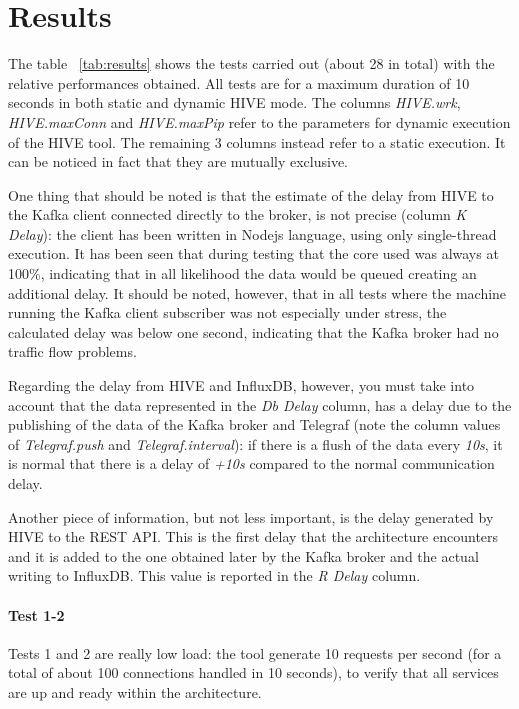 \documentclass[]{IEEEtran}
\begin{document}
\section{Results}
The table ~\ref{tab:results} shows the tests carried out (about 28 in total) with the relative performances obtained.
All tests are for a maximum duration of 10 seconds in both static and dynamic HIVE mode. The columns \textit{HIVE.wrk}, \textit{HIVE.maxConn} and \textit{HIVE.maxPip} refer to the parameters for dynamic execution of the HIVE tool. The remaining 3 columns instead refer to a static execution. It can be noticed in fact that they are mutually exclusive.

One thing that should be noted is that the estimate of the delay from HIVE to the Kafka client connected directly to the broker, is not precise (column \textit{K Delay}): the client has been written in Nodejs language, using only single-thread execution. It has been seen that during testing that the core used was always at 100\%, indicating that in all likelihood the data would be queued creating an additional delay. 
It should be noted, however, that in all tests where the machine running the Kafka client subscriber was not especially under stress, the calculated delay was below one second, indicating that the Kafka broker had no traffic flow problems.

Regarding the delay from HIVE and InfluxDB, however, you must take into account that the data represented in the \textit{Db Delay} column, has a delay due to the publishing of the data of the Kafka broker and Telegraf (note the column values of \textit{Telegraf.push} and \textit{Telegraf.interval}): if there is a flush of the data every \textit{10s}, it is normal that there is a delay of \textit{+10s} compared to the normal communication delay.

Another piece of information, but not less important, is the delay generated by HIVE to the REST API. This is the first delay that the architecture encounters and it is added to the one obtained later by the Kafka broker and the actual writing to InfluxDB. This value is reported in the \textit{R Delay} column.

\paragraph{Test 1-2}Tests 1 and 2 are really low load: the tool generate 10 requests per second (for a total of about 100 connections handled in 10 seconds), to verify that all services are up and ready within the architecture.
\end{document}
